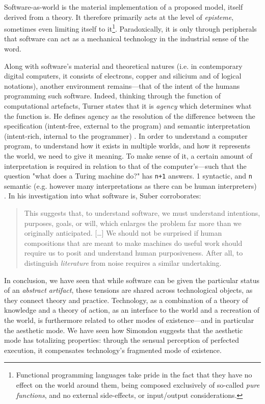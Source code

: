 Software-as-world is the material implementation of a proposed model, itself derived from a theory. It therefore primarily acts at the level of \emph{episteme}, sometimes even limiting itself to it\footnote{Functional programming languages take pride in the fact that they have no effect on the world around them, being composed exclusively of so-called \emph{pure functions}, and no external side-effects, or input/output considerations.}. Paradoxically, it is only through peripherals that software can act as a mechanical technology in the industrial sense of the word.

Along with software's material and theoretical natures (i.e. in contemporary digital computers, it consists of electrons, copper and silicium and of logical notations), another environment remains—that of the intent of the humans programming such software. Indeed, thinking through the function of computational artefacts, Turner states that it is \emph{agency} which determines what the function is. He defines agency as the resolution of the difference between the specification (intent-free, external to the program) and semantic interpretation (intent-rich, internal to the programmer) \citep{turner_computational_2018}. In order to understand a computer program, to understand how it exists in multiple worlds, and how it represents the world, we need to give it meaning. To make sense of it, a certain amount of interpretation is required in relation to that of the computer's—such that the question "what does a Turing machine do?" has \lstinline{n+1} answers. 1 syntactic, and \lstinline{n} semantic (e.g. however many interpretations as there can be human interpreters) \citep{rapaport_philosophy_2005}. In his investigation into what software is, Suber corroborates:

\begin{quote}
    This suggests that, to understand software, we must understand intentions, purposes, goals, or will, which enlarges the problem far more than we originally anticipated. [\dots] We should not be surprised if human compositions that are meant to make machines do useful work should require us to posit and understand human purposiveness. After all, to distinguish \emph{literature} from noise requires a similar undertaking. \citep{suber_what_1988}
\end{quote}

\spacersmall

In conclusion, we have seen that while software can be given the particular status of an \emph{abstract artifact}, these tensions are shared across technological objects, as they connect theory and practice. Technology, as a combination of a theory of knowledge and a theory of action, as an interface to the world and a recreation of the world, is furthermore related to other modes of existence—and in particular the aesthetic mode. We have seen how Simondon suggests that the aesthetic mode has totalizing properties: through the sensual perception of perfected execution, it compensates technology's fragmented mode of existence.


